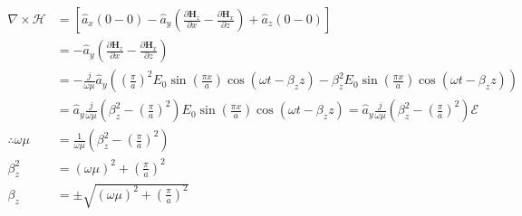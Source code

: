 \documentclass[12pt]{article}
\begin{document}
\begin{align*}
  \nabla \times \bm{\mathcal{H}} &= \left[\hat a_x\left(0 - 0\right) - \hat a_y\left( \frac{\partial\bm{H}_z}{\partial x} - \frac{\partial\bm{H}_x}{\partial z}  \right) + \hat a_z\left( 0 -  0\right)\right]\\
                                 &= - \hat a_y\left( \frac{\partial\bm{H}_z}{\partial x} - \frac{\partial\bm{H}_x}{\partial z}  \right)\\
                                 &= -\frac{j}{\omega\mu} \hat a_y\left(\left(\frac{\pi}{a}\right)^2 E_0\sin{\left(\frac{\pi x}{a}\right)}\cos{(\omega t - \beta_zz)} - \beta_z^2E_0\sin{\left(\frac{\pi x}{a}\right)}\cos{(\omega t - \beta_zz)}  \right)\\
                                 &= \hat a_y\frac{j}{\omega\mu}\left(\beta_z^2 - \left(\frac{\pi}{a}\right)^2\right)E_0\sin{\left(\frac{\pi x}{a}\right)}\cos{(\omega t - \beta_zz)} = \hat a_y\frac{j}{\omega\mu}\left(\beta_z^2 - \left(\frac{\pi}{a}\right)^2\right) \bm{\mathcal{E}}\\
  \therefore \omega \mu &= \frac{1}{\omega\mu}\left(\beta_z^2 - \left(\frac{\pi}{a}\right)^2\right)\\
  \beta_z^2  &= (\omega\mu)^2  + \left(\frac{\pi}{a}\right)^2\\
  \beta_z &= \pm \sqrt{(\omega\mu)^2  + \left(\frac{\pi}{a}\right)^2}
\end{align*}

\end{document}
